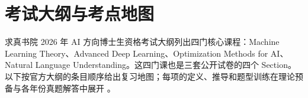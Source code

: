 \documentclass[11pt]{ctexart}
\begin{document}
\section{考试大纲与考点地图}
\label{sec:syllabus}

求真书院 2026 年 AI 方向博士生资格考试大纲列出四门核心课程：Machine Learning Theory、Advanced Deep Learning、Optimization Methods for AI、Natural Language Understanding。这四门课也是三套公开试卷的四个 Section。以下按官方大纲的条目顺序给出复习地图；每项的定义、推导和题型训练在理论预备与各年份真题解答中展开 \parencite{qzc-ai-syllabus-2026}。

\newcommand{\MLTextbooks}{
\subsubsection{Understanding Machine Learning: From Theory to Algorithms}

\textcite{shalev2014uml} 是本课程从学习问题形式化到可学习性证明的主线教材。尤其应把第 2--7 章连成 ERM--PAC--uniform convergence--VC--SRM 的证明链。

\begingroup
\small
\begin{longtable}{L{0.22\textwidth}L{0.50\textwidth}L{0.18\textwidth}}
\toprule
原书章节群 & 讲什么 & 对应考纲/考点 \\
\midrule
\endfirsthead
\toprule
原书章节群 & 讲什么 & 对应考纲/考点 \\
\midrule
\endhead
第 1--2 章：学习问题与 ERM & 统计学习框架、经验风险、过拟合、归纳偏置、有限假设类。 & 监督学习、经验/真实风险。 \\
第 3--4 章：PAC 与 uniform convergence & realizable/agnostic PAC、样本复杂度，以及有限类的泛化保证。 & PAC 定义、Hoeffding/union bound 证明套路。 \\
第 5--7 章：No-Free-Lunch、VC 与模型选择 & 误差分解、VC 维、Sauer 引理、基本学习定理、SRM 与 MDL。 & VC/Sauer、偏差--方差、模型选择。 \\
第 8--14 章：可计算学习与算法例子 & ERM 的计算复杂度、半空间、线性回归、正则化、核方法、决策树和最近邻。 & 回归、SVM/核、树、\(k\)-NN。 \\
\bottomrule
\end{longtable}
\endgroup

\subsubsection{Foundations of Machine Learning, 2nd ed.}

\textcite{mohri2018foundations} 提供更偏理论和算法的补充视角；对于 Rademacher complexity、margin、kernel 和 online learning，它比前书更适合作为证明细节的回查来源。

}
\end{document}
